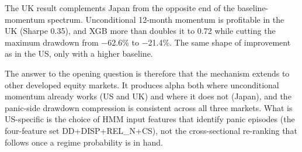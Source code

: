 The UK result complements Japan from the opposite end of the baseline-momentum spectrum. Unconditional 12-month momentum is profitable in the UK (Sharpe 0.35), and XGB more than doubles it to 0.72 while cutting the maximum drawdown from $-$62.6\% to $-$21.4\%. The same shape of improvement as in the US, only with a higher baseline.

The answer to the opening question is therefore that the mechanism extends to other developed equity markets. It produces alpha both where unconditional momentum already works (US and UK) and where it does not (Japan), and the panic-side drawdown compression is consistent across all three markets. What is US-specific is the choice of HMM input features that identify panic episodes (the four-feature set DD+DISP+REL\_N+CS), not the cross-sectional re-ranking that follows once a regime probability is in hand.
